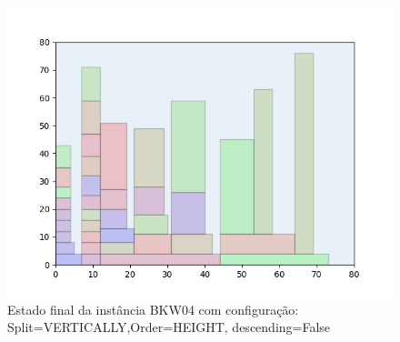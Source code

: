 \begin{figure}[H]
    \centering
    \caption[]{Estado final da instância BKW04 com configuração: Split=VERTICALLY,Order=HEIGHT, descending=False}
    \label{fig:bkw04-vertically-height-false}
    \includegraphics[scale=0.5]{output/figures/bkw/bkw04/vertically/height/false/00}
\end{figure}